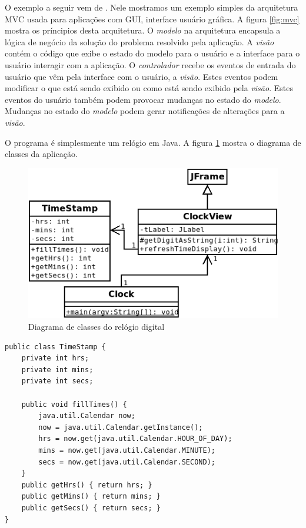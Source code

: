 \documentclass[
	article,			%
	12pt,				%
	openright,
	twoside,			%
	a4paper,			%
	english,			%
	french,
	brazil,				%
	sumario=tradicional
	]{abntex2}
\begin{document}
O exemplo a seguir vem de . Nele mostramos um exemplo simples da arquitetura MVC usada para aplicações com GUI, interface usuário gráfica. A figura \ref{fig:mvc} mostra os príncipios desta arquitetura. O \emph{modelo} na arquitetura encapsula a lógica de negócio da solução do problema resolvido pela aplicação. A \emph{visão} contém o código que exibe o estado do modelo para o usuário e a interface para o usuário interagir com a aplicação. O \emph{controlador} recebe os eventos de entrada do usuário que vêm pela interface com o usuário, a \emph{visão}. Estes eventos podem modificar o que está sendo exibido ou como está sendo exibido pela \emph{visão}. Estes eventos do usuário também podem provocar mudanças no estado do \emph{modelo}. Mudanças no estado do \emph{modelo} podem gerar notificações de alterações para a \emph{visão}.

O programa é simplesmente um relógio em Java. A figura \ref{fig:clock} mostra o diagrama de classes da aplicação.

\begin{figure}
\begin{center}
\includegraphics[scale=0.6]{clock.png} 
\caption{Diagrama de classes do relógio digital} \label{fig:clock}
\end{center}
\end{figure}

\begin{verbatim}
public class TimeStamp {
    private int hrs;
    private int mins;
    private int secs;
    
    public void fillTimes() {
        java.util.Calendar now;
        now = java.util.Calendar.getInstance();
        hrs = now.get(java.util.Calendar.HOUR_OF_DAY);
        mins = now.get(java.util.Calendar.MINUTE);
        secs = now.get(java.util.Calendar.SECOND);
    }
    public getHrs() { return hrs; }
    public getMins() { return mins; }
    public getSecs() { return secs; }
}
\end{verbatim}
\end{document}
